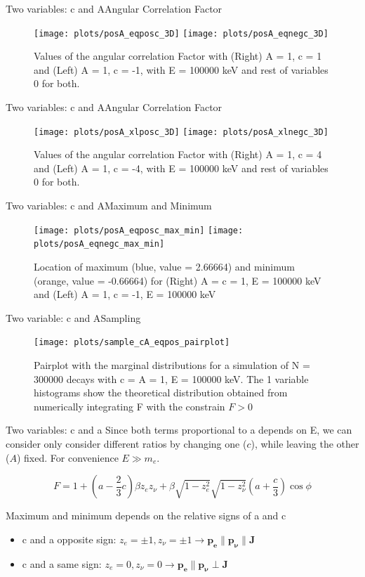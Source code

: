 \documentclass{beamer}
\begin{document}
\begin{frame}{Two variables: c and A}{Angular Correlation Factor}
	\begin{figure}
		\centering
		\texttt{[image: plots/posA\_eqposc\_3D]}
		\texttt{[image: plots/posA\_eqnegc\_3D]}
		\caption{Values of the angular correlation Factor with (Right) A = 1, c = 1 and (Left) A = 1, c = -1, with E = 100000 keV and rest of variables 0 for both.}
	\end{figure}
\end{frame}
\begin{frame}{Two variables: c and A}{Angular Correlation Factor}
	\begin{figure}
		\centering
		\texttt{[image: plots/posA\_xlposc\_3D]}
		\texttt{[image: plots/posA\_xlnegc\_3D]}
		\caption{Values of the angular correlation Factor with (Right) A = 1, c = 4 and (Left) A = 1, c = -4, with E = 100000 keV and rest of variables 0 for both.}
		
	\end{figure}
\end{frame}
\begin{frame}{Two variables: c and A}{Maximum and Minimum}
	\begin{figure}
		\centering
		\texttt{[image: plots/posA\_eqposc\_max\_min]}
		\texttt{[image: plots/posA\_eqnegc\_max\_min]}
		\caption{Location of maximum (blue, value = 2.66664) and minimum (orange, value = -0.66664) for (Right) A = c = 1, E = 100000 keV and (Left) A = 1, c = -1, E = 100000 keV}
	\end{figure}
\end{frame}
\begin{frame}{Two variable: c and A}{Sampling}
	\begin{figure}
		\centering
		\texttt{[image: plots/sample\_cA\_eqpos\_pairplot]}
		\caption{Pairplot with the marginal distributions for a simulation of N = 300000 decays with c = A = 1, E = 100000 keV. The 1 variable histograms show the theoretical distribution obtained from numerically integrating F with the constrain $F > 0$}
	\end{figure}
\end{frame}
\begin{frame}{Two variables: c and a}
	Since both terms proportional to a depends on E, we can consider only consider different ratios by changing one ($c$), while leaving the other ($A$) fixed. For convenience $E \gg m_e$.
	
	$$ F = 1 +\left(a-\frac 23 c\right)\beta z_ez_\nu + \beta \sqrt{1-z_e^2}\sqrt{1-z_\nu^2} \left(a+\frac c3\right)\cos\phi $$
	
	Maximum and minimum depends on the relative signs of a and c
	\begin{itemize}
		\item c and a opposite sign: $z_e = \pm1,z_\nu = \pm1 \rightarrow \boldsymbol{p_e} \parallel \boldsymbol{p_\nu} \parallel \boldsymbol{J}$
		\item c and a same sign: $z_e = 0,z_\nu = 0 \rightarrow \boldsymbol{p_e} \parallel \boldsymbol{p_\nu} \perp \boldsymbol{J}$    
	\end{itemize} 
	
\end{frame}
\end{document}
